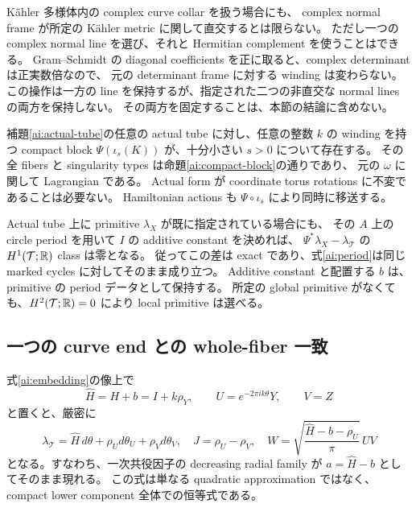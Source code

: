 K\"ahler 多様体内の complex curve collar を扱う場合にも、
complex normal frame が所定の K\"ahler metric に関して直交するとは限らない。
ただし一つの complex normal line を選び、それと Hermitian complement を使うことはできる。
Gram--Schmidt の diagonal coefficients を正に取ると、complex determinant は正実数倍なので、
元の determinant frame に対する winding は変わらない。
この操作は一方の line を保持するが、指定された二つの非直交な normal lines の両方を保持しない。
その両方を固定することは、本節の結論に含めない。

\begin{corollary}
\label{ai:actual-insertion}
補題\ref{ai:actual-tube}の任意の actual tube に対し、任意の整数 $k$ の winding を持つ
compact block $\Psi(\iota_s(K))$ が、十分小さい $s>0$ について存在する。
その全 fibers と singularity types は命題\ref{ai:compact-block}の通りであり、
元の $\omega$ に関して Lagrangian である。
Actual form が coordinate torus rotations に不変であることは必要ない。
Hamiltonian actions も $\Psi\circ\iota_s$ により同時に移送する。
\end{corollary}

Actual tube 上に primitive $\lambda_X$ が既に指定されている場合にも、
その $A$ 上の circle period を用いて $I$ の additive constant を決めれば、
$\Psi^*\lambda_X-\lambda_{\mathcal T}$ の $H^1(\mathcal T;\mathbb R)$ class は零となる。
従ってこの差は exact であり、式\eqref{ai:period}は同じ marked cycles に対してそのまま成り立つ。
Additive constant と配置する $b$ は、primitive の period データとして保持する。
所定の global primitive がなくても、$H^2(\mathcal T;\mathbb R)=0$ により local primitive は選べる。

\subsection{一つの curve end との whole-fiber 一致}

式\eqref{ai:embedding}の像上で
\[
 \widehat H=H+b=I+k\rho_Y,\qquad
 U=e^{-2\pi ik\theta}Y,\qquad V=Z
\]
と置くと、厳密に
\begin{equation}\label{ai:end-coordinates}
 \lambda_{\mathcal T}=\widehat H\,d\theta+\rho_Ud\theta_U+\rho_Vd\theta_V,
 \quad J=\rho_U-\rho_V,
 \quad W=\sqrt{\frac{\widehat H-b-\rho_U}{\pi}}\,UV
\end{equation}
となる。すなわち、一次共役因子の decreasing radial family が
$a=\widehat H-b$ としてそのまま現れる。
この式は単なる quadratic approximation ではなく、compact lower component 全体での恒等式である。

